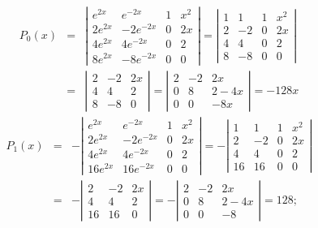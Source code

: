 \documentclass{ximera}
\begin{document}
\begin{problem}
\begin{enumerate}
\begin{solution}
\begin{eqnarray*}
P_0(x)&=&
\left|\begin{array}{crcc}
e^{2x}&e^{-2x}&1&x^2\\
2e^{2x}&-2e^{-2x}&0&2x\\
4e^{2x}&4e^{-2x}&0&2\\
8e^{2x}&-8e^{-2x}&0&0
\end{array}\right|=
\left|\begin{array}{crcc}
1&1&1&x^2\\
2&-2&0&2x\\
4&4&0&2\\
8&-8&0&0
\end{array}\right|\\
&=&\left|\begin{array}{crcc}
2&-2&2x\\
4&4&2\\
8&-8&0
\end{array}\right|
=\left|\begin{array}{crcc}
2&-2&2x\\
0&8&2-4x\\
0&0&-8x
\end{array}\right|=-128x
\end{eqnarray*}
\begin{eqnarray*}
P_1(x)&=&
-\left|\begin{array}{crcc}
e^{2x}&e^{-2x}&1&x^2\\
2e^{2x}&-2e^{-2x}&0&2x\\
4e^{2x}&4e^{-2x}&0&2\\
16e^{2x}&16e^{-2x}&0&0
\end{array}\right|=
-\left|\begin{array}{crcc}
1&1&1&x^2\\
2&-2&0&2x\\
4&4&0&2\\
16&16&0&0
\end{array}\right|\\
&=&-\left|\begin{array}{crcc}
2&-2&2x\\
4&4&2\\
16&16&0
\end{array}\right|
=-\left|\begin{array}{crcc}
2&-2&2x\\
0&8&2-4x\\
0&0&-8
\end{array}\right|=128;
\end{eqnarray*}
\begin{eqnarray*}

\end{eqnarray*}
\end{solution}
\end{enumerate}
\end{problem}
\end{document}
